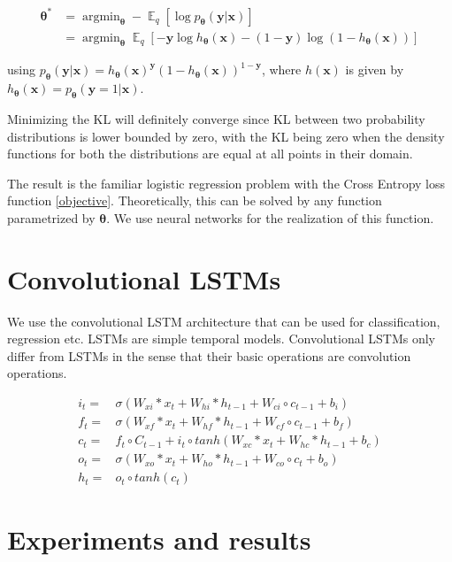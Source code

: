 \documentclass[journal]{IEEEtran}
\newcommand{\bx}{\bm{x}}
\newcommand{\by}{\bm{y}}
\newcommand{\btheta}{\bm{\theta}}
\DeclareMathOperator{\expectation}{\mathbb{E}}
\DeclareMathOperator*{\argmin}{argmin}
\begin{document}
\begin{equation}
	\label{objective}
	\begin{aligned}
		\btheta ^ * & = \argmin_{\btheta} - \expectation_q [\log p_{\btheta} (\by | \bx)]
		\\
		& = \argmin_{\btheta} \expectation_q [- \by \log h_{\btheta} (\bx) - (1 - \by) \log (1 - h_{\btheta} (\bx))]
	\end{aligned}
\end{equation}

using $p_{\btheta} (\by | \bx) = h_{\btheta} (\bx) ^ {\by} (1 - h_{\btheta} (\bx)) ^ {1 - \by}$, where $h(\bx)$ is given by $h_{\btheta} (\bx) = p_{\btheta} (\by = 1 | \bx)$.

Minimizing the KL will definitely converge since KL between two probability distributions is lower bounded by zero, with the KL being zero when the density functions for both the distributions are equal at all points in their domain.

The result is the familiar logistic regression problem with the Cross Entropy loss function \eqref{objective}. Theoretically, this can be solved by any function parametrized by $\btheta$. We use neural networks for the realization of this function.

\section{Convolutional LSTMs}
We use the convolutional LSTM architecture that can be used for classification, regression etc. LSTMs are simple temporal models. Convolutional LSTMs only differ from LSTMs in the sense that their basic operations are convolution operations.

\begin{equation}
	\label{conv_lstm}
	\begin{aligned}
		i_t = & \sigma(W_{xi} * x_t + W_{hi} * h_{t-1} + W_{ci} \circ c_{t-1} + b_i)
		\\
		f_t = & \sigma(W_{xf} * x_t + W_{hf} * h_{t-1} + W_{cf} \circ c_{t-1} + b_f)
		\\
		c_t = & f_t \circ C_{t-1} + i_t \circ tanh(W_{xc} * x_t + W_{hc} * h_{t-1} + b_c)
		\\
		o_t = & \sigma(W_{xo} * x_t + W_{ho} * h_{t-1} + W_{co} \circ c_{t} + b_o)
		\\
		h_t = & o_t \circ tanh(c_t)
	\end{aligned}
\end{equation}

\section{Experiments and results}
\end{document}
